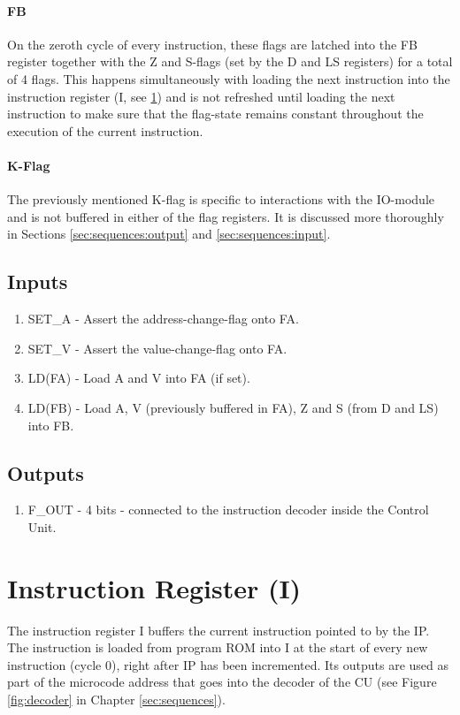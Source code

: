 \paragraph{FB} On the zeroth cycle of every instruction, these flags are latched into the FB register together with the Z and S-flags (set by the D and LS registers) for a total of 4 flags. This happens simultaneously with loading the next instruction into the instruction register (I, see \ref{sec:architecture:i}) and is not refreshed until loading the next instruction to make sure that the flag-state remains constant throughout the execution of the current instruction.

\paragraph{K-Flag} The previously mentioned K-flag is specific to interactions with the IO-module and is not buffered in either of the flag registers. It is discussed more thoroughly in Sections \ref{sec:sequences:output} and \ref{sec:sequences:input}.

\subsection*{Inputs}
\begin{enumerate}
\itemsep0em 
\item SET\_A - Assert the address-change-flag onto FA.
\item SET\_V - Assert the value-change-flag onto FA.
\item LD(FA) - Load A and V into FA (if set).
\item LD(FB) - Load A, V (previously buffered in FA), Z and S (from D and LS) into FB. 
\end{enumerate}

\subsection*{Outputs}
\begin{enumerate}
\itemsep0em 
\item F\_OUT - 4 bits - connected to the instruction decoder inside the Control Unit.
\end{enumerate}


\section{Instruction Register (I)} \label{sec:architecture:i}
The instruction register I buffers the current instruction pointed to by the IP. The instruction is loaded from program ROM into I at the start of every new instruction (cycle 0), right after IP has been incremented. Its outputs are used as part of the microcode address that goes into the decoder of the CU (see Figure \ref{fig:decoder} in Chapter \ref{sec:sequences}).


